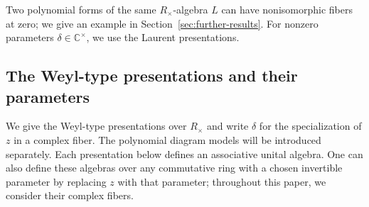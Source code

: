 \documentclass[11pt,a4paper]{amsart}
\theoremstyle{uprightdefinition}
\theoremstyle{remark}\newtheorem{remark}[theorem]{Remark}
\begin{document}
Two polynomial forms of the same $R_\times$-algebra $L$ can have
nonisomorphic fibers at zero; we give an example in
Section~\ref{sec:further-results}. For nonzero parameters $\delta\in\mathbb C^\times$, we use the Laurent presentations.

\subsection{The Weyl-type presentations and their parameters}
We give the Weyl-type presentations over $R_\times$ and write $\delta$
for the specialization of $z$ in a complex fiber. The polynomial diagram
models will be introduced separately.
Each presentation below defines an associative unital algebra. One can also
define these algebras over any commutative ring with a chosen invertible
parameter by replacing $z$ with that parameter; throughout this paper, we consider their complex fibers.
\end{document}
